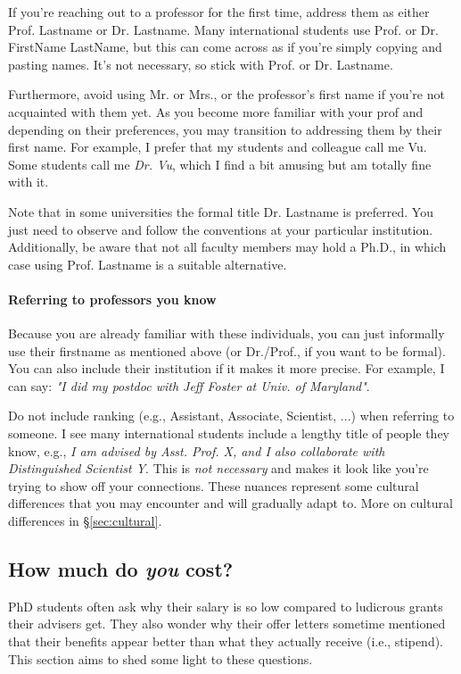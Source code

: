 \documentclass[11pt]{article}
\begin{document}
If you're reaching out to a professor for the first time,  address them as either Prof. Lastname or Dr. Lastname. Many international students use Prof. or Dr. FirstName LastName, but this can come across as if you're simply copying and pasting names. It's not necessary, so stick with Prof. or Dr. Lastname.


Furthermore, avoid using Mr. or Mrs., or the professor's first name if you're not acquainted with them yet.  As you become more familiar with your prof and depending on their preferences, you may transition to addressing them by their first name.
For example, I prefer that my students and colleague call me Vu. Some students call me \emph{Dr. Vu}, which I find a bit amusing but am totally fine with it. 


Note that in some universities the formal title Dr. Lastname is preferred. You just need to observe and follow the conventions at your particular institution. Additionally, be aware that not all faculty members may hold a Ph.D., in which case using Prof. Lastname is a suitable alternative.


\paragraph{Referring to professors you know} Because you are already familiar with these individuals, you can just informally use their firstname as mentioned above (or Dr./Prof., if you want to be formal). You can also include their institution if it makes it more precise.  For example, I can say:  \emph{"I did my postdoc with Jeff Foster at Univ. of Maryland"}.   

Do not include ranking (e.g., Assistant, Associate, Scientist, ...) when referring to someone. I see many international students include a lengthy title of people they know, e.g., \emph{I am advised by Asst. Prof. X, and I also collaborate with Distinguished Scientist Y}.  This is \emph{not necessary} and makes it look like you're trying to show off your connections. These nuances represent some cultural differences that you may encounter and will gradually adapt to. More on cultural differences in \S\ref{sec:cultural}.

\subsection{How much do \emph{you} cost?}\label{sec:ra-cost}
PhD students often ask why their salary is so low compared to ludicrous grants their advisers get. They also wonder why their offer letters sometime mentioned that their benefits appear better than what they actually receive (i.e., stipend).  This section aims to shed some light to these questions.
\end{document}
